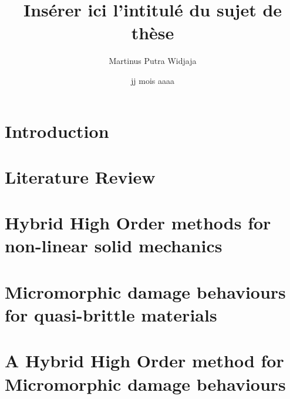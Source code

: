 \documentclass[a4paper, 11pt]{book}
\title{Insérer ici l'intitulé du sujet de thèse}
\author{Martinus Putra Widjaja}
\institute{MINES ParisTech}
\date{jj mois aaaa}
\begin{document}
\maketitle{}

\tableofcontents
\listoffigures

\chapter{Introduction}



\chapter{Literature Review}




\chapter{Hybrid High Order methods for non-linear solid mechanics}








\chapter{Micromorphic damage behaviours for quasi-brittle materials}





\chapter{A Hybrid High Order method for Micromorphic damage behaviours}






\end{document}
